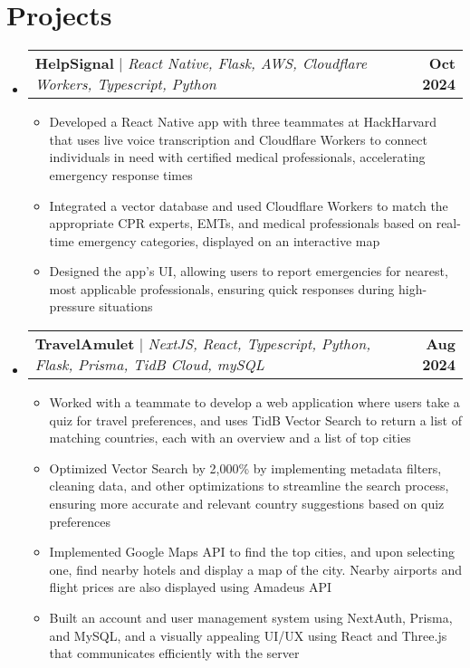 \documentclass[letterpaper,11pt]{article}
\makeatletter
\newcommand{\resumeItem}[1]{
  \item\small{
    {#1 \vspace{-2pt}}
  }
}
\newcommand{\resumeProjectHeading}[2]{
    \item
    \begin{tabular*}{1.001\textwidth}{l@{\extracolsep{\fill}}r}
      \small#1 & \textbf{\small #2}\\
    \end{tabular*}\vspace{-7pt}
}
\newcommand{\resumeSubHeadingListStart}{\begin{itemize}[leftmargin=0.0in, label={}]}
\newcommand{\resumeSubHeadingListEnd}{\end{itemize}}
\newcommand{\resumeItemListStart}{\begin{itemize}}
\newcommand{\resumeItemListEnd}{\end{itemize}\vspace{-5pt}}
\makeatother
\begin{document}
\vspace{-20pt}
\section{Projects}
  \vspace{-5pt}
    \resumeSubHeadingListStart
      \resumeProjectHeading
          {\textbf{HelpSignal} $|$ \emph{React Native, Flask, AWS, Cloudflare Workers, Typescript, Python}}{Oct 2024}
          \resumeItemListStart
            \resumeItem{Developed a React Native app with three teammates at HackHarvard that uses live voice transcription and Cloudflare Workers to connect individuals in need with certified medical professionals, accelerating emergency response times}
            \resumeItem{Integrated a vector database and used Cloudflare Workers to match the appropriate CPR experts, EMTs, and medical professionals based on real-time emergency categories, displayed on an interactive map}
            \resumeItem{Designed the app's UI, allowing users to report emergencies for nearest, most applicable professionals, ensuring quick responses during high-pressure situations}
        \resumeItemListEnd
      \vspace{-18pt}
      \resumeProjectHeading
          {\textbf{TravelAmulet} $|$ \emph{NextJS, React, Typescript, Python, Flask, Prisma, TidB Cloud, mySQL}}{Aug 2024}
          \resumeItemListStart
            \resumeItem{Worked with a teammate to develop a web application where users take a quiz for travel preferences, and uses TidB Vector Search to return a list of matching countries, each with an overview and a list of top cities}
            \resumeItem{Optimized Vector Search by 2,000\% by implementing metadata filters, cleaning data, and other optimizations to streamline the search process, ensuring more accurate and relevant country suggestions based on quiz preferences}
            \resumeItem{Implemented Google Maps API to find the top cities, and upon selecting one, find nearby hotels and display a map of the city. Nearby airports and flight prices are also displayed using Amadeus API}
            \resumeItem{Built an account and user management system using NextAuth, Prisma, and MySQL, and a visually appealing UI/UX using React and Three.js that communicates efficiently with the server}
          \resumeItemListEnd
    \resumeSubHeadingListEnd


\vspace{-20pt}
\end{document}
